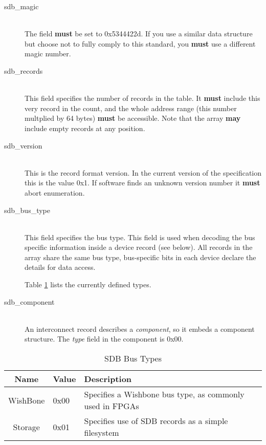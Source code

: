 \documentclass[a4paper, 12pt]{article}
\begin{document}
\begin{description}
\item[sdb\_magic] \hfill \\
The field \textbf{must} be set to 0x5344422d. If you use a similar data structure but
choose not to fully comply to this standard, you \textbf{must} use a different magic
number.

\item[sdb\_records] \hfill \\
This field specifies the number of records in the table. It \textbf{must} include
this very record in the count, and the whole address range (this number multplied by 64 bytes)
\textbf{must} be accessible. Note that the array \textbf{may} include empty records at any position.

\item[sdb\_version] \hfill \\
This is the record format version. In the current version of the specification this is the
value 0x1. If software finds an unknown version number it \textbf{must} abort enumeration.

\item[sdb\_bus\_type] \hfill \\
This field specifies the bus type. This field is used when decoding the bus specific information
inside a device record (see below).  All records in the array share the same
bus type, bus-specific bits in each device declare the details for data access.

Table \ref{bus_type} lists the currently defined types.

\item[sdb\_component] \hfill \\
An interconnect record describes a \textit{component}, so it embeds a component structure.
The \textit{type} field in the component is 0x00.
\end{description}


\begin{center}
  \begin{savenotes}
    \begin{table}[!ht]\footnotesize
      \caption{SDB Bus Types}\label{bus_type}\centering
        \begin{tabular}{| c | l | p{5cm} |} \hline
        Name & Value & Description \\ \hline
        WishBone & 0x00 & Specifies a Wishbone bus type, as commonly used in FPGAs \\ \hline
        Storage & 0x01 & Specifies use of SDB records as a simple filesystem \\ \hline
        \end{tabular}
    \end{table}
  \end{savenotes}
\end{center}
\end{document}
